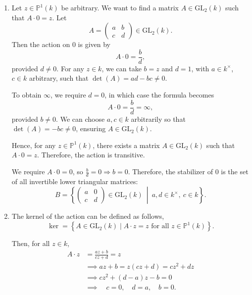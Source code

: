 \documentclass[12pt]{article}
\begin{document}
\begin{enumerate}[label=(\arabic*)]
\item %

Let \( z \in \mathbb{P}^1(k) \) be arbitrary. We want to find a matrix \( A \in \mathrm{GL}_2(k) \) such that \( A \cdot 0 = z \). Let
\[
A = \begin{pmatrix} a & b \\ c & d \end{pmatrix} \in \mathrm{GL}_2(k).
\]
Then the action on \( 0 \) is given by
\[
A \cdot 0 = \frac{b}{d},
\]
provided \( d \neq 0 \). For any \( z \in k \), we can take \( b = z \) and \( d = 1 \), with \( a \in k^\times \), \( c \in k \) arbitrary, such that \( \det(A) = ad - bc \neq 0 \).

To obtain \( \infty \), we require \( d = 0 \), in which case the formula becomes
\[
A \cdot 0 = \frac{b}{d} = \infty,
\]
provided \( b \neq 0 \). We can choose \( a, c \in k \) arbitrarily so that \( \det(A) = -bc \neq 0 \), ensuring \( A \in \mathrm{GL}_2(k) \).

Hence, for any \( z \in \mathbb{P}^1(k) \), there exists a matrix \( A \in \mathrm{GL}_2(k) \) such that \( A \cdot 0 = z \). Therefore, the action is transitive.

We require \( A \cdot 0 = 0 \), so \( \frac{b}{d} = 0 \Rightarrow b = 0 \). Therefore, the stabilizer of 0 is the set of all invertible lower triangular matrices:
\[
B = \left\{ \begin{pmatrix} a & 0 \\ c & d \end{pmatrix} \in \mathrm{GL}_2(k) \ \middle| \ a, d \in k^\times, \ c \in k \right\}.
\]

\item %

The kernel of the action can be defined as follows,
\[
\ker = \left\{ A \in \mathrm{GL}_2(k) \mid A \cdot z = z \text{ for all } z \in \mathbb{P}^1(k) \right\}.
\]

Then, for all \( z \in k \),
\begin{align*}
A \cdot z &= \frac{az + b}{cz + d} = z \\
&\implies az + b = z(cz + d) = cz^2 + dz \\
&\implies cz^2 + (d - a)z - b = 0 \\
&\implies \quad c = 0, \quad d = a, \quad b = 0.
\end{align*}


\end{enumerate}
\end{document}

